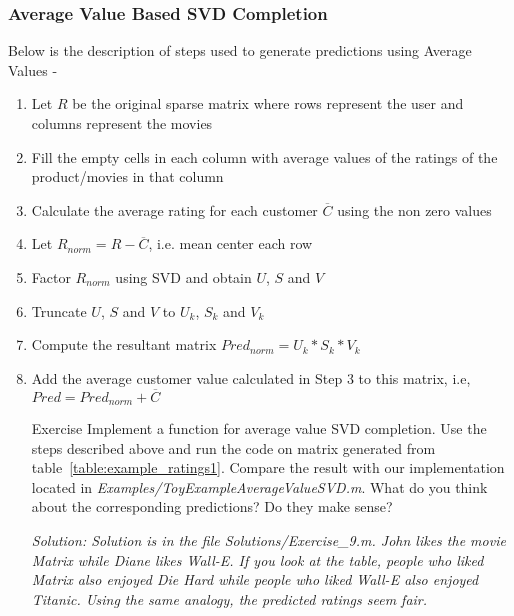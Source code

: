   \subsubsection{Average Value Based SVD Completion} 
  Below is the description of steps used to generate predictions using Average Values -
  \begin{enumerate}
    \item Let $R$ be the original sparse matrix where rows represent the user and columns represent the movies
    \item Fill the empty cells in each column with average values of the ratings of the product/movies in that column
    \item Calculate the average rating for each customer $\overline{C}$ using the non zero values
    \item Let $R_{norm} = R - \overline{C}$, i.e. mean center each row 
    \item Factor $R_{norm}$ using SVD and obtain $U$, $S$ and $V$
    \item Truncate $U$, $S$ and $V$ to $U_k$, $S_k$ and $V_k$
    \item Compute the resultant matrix $Pred_{norm} = U_k*S_k*V_k$
    \item Add the average customer value calculated in Step 3 to this matrix, i.e, $Pred = Pred_{norm} + \overline{C} $
\begin{myremark}{Exercise }
Implement a function for average value SVD completion. Use the steps described above and run the code on matrix generated from table~\ref{table:example_ratings1}. Compare the result with our implementation located in \textit{Examples/ToyExampleAverageValueSVD.m}. What do you think about the corresponding predictions? Do they make sense? 
\end{myremark}
\textit{Solution: Solution is in the file Solutions/Exercise\_9.m. John likes the movie Matrix while Diane likes Wall-E. If you look at the table, people who liked Matrix also enjoyed Die Hard while people who liked Wall-E also enjoyed Titanic. Using the same analogy, the predicted ratings seem fair.}


\end{enumerate}
